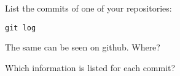List the commits of one of your repositories:
\begin{verbatim}
git log
\end{verbatim}

The same can be seen on github. Where?

Which information is listed for each commit?

